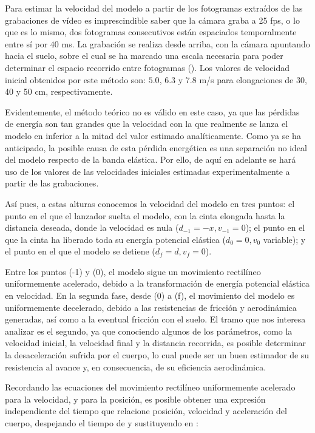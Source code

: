 Para estimar la velocidad del modelo a partir de los fotogramas extraídos de las grabaciones de vídeo es imprescindible saber que la cámara graba a 25 fps, o lo que es lo mismo, dos fotogramas consecutivos están espaciados temporalmente entre sí por $40$ ms. La grabación se realiza desde arriba, con la cámara apuntando hacia el suelo, sobre el cual se ha marcado una escala necesaria para poder determinar el espacio recorrido entre fotogramas (). Los valores de velocidad inicial obtenidos por este método son: $5.0$, $6.3$ y $7.8$ m/s para elongaciones de 30, 40 y 50 cm, respectivamente.

Evidentemente, el método teórico no es válido en este caso, ya que las pérdidas de energía son tan grandes que la velocidad con la que realmente se lanza el modelo en inferior a la mitad del valor estimado analíticamente. Como ya se ha anticipado, la posible causa de esta pérdida energética es una separación no ideal del modelo respecto de la banda elástica. Por ello, de aquí en adelante se hará uso de los valores de las velocidades iniciales estimadas experimentalmente a partir de las grabaciones.

Así pues, a estas alturas conocemos la velocidad del modelo en tres puntos: el punto en el que el lanzador suelta el modelo, con la cinta elongada hasta la distancia deseada, donde la velocidad es nula ($d_{-1}=-x, v_{-1}=0$); el punto en el que la cinta ha liberado toda su energía potencial elástica ($d_0=0, v_0$ variable); y el punto en el que el modelo se detiene ($d_f=d, v_f=0$).

Entre los puntos (-1) y (0), el modelo sigue un movimiento rectilíneo uniformemente acelerado, debido a la transformación de energía potencial elástica en velocidad. En la segunda fase, desde (0) a (f), el movimiento del modelo es uniformemente decelerado, debido a las resistencias de fricción y aerodinámica generadas, así como a la eventual fricción con el suelo. El tramo que nos interesa analizar es el segundo, ya que conociendo algunos de los parámetros, como la velocidad inicial, la velocidad final y la distancia recorrida, es posible determinar la desaceleración sufrida por el cuerpo, lo cual puede ser un buen estimador de su resistencia al avance y, en consecuencia, de su eficiencia aerodinámica.

Recordando las ecuaciones del movimiento rectilíneo uniformemente acelerado para la velocidad,
y para la posición,
es posible obtener una expresión independiente del tiempo que relacione posición, velocidad y aceleración del cuerpo, despejando el tiempo de  y sustituyendo en :

